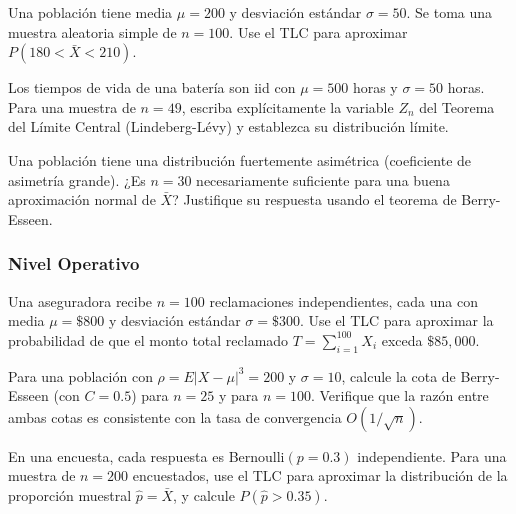 \begin{problema}
	\label{prob:5.2.1}
	Una población tiene media $\mu=200$ y desviación estándar $\sigma=50$. Se toma una muestra aleatoria simple de $n=100$. Use el TLC para aproximar $P(180 < \bar{X} < 210)$.
\end{problema}

\begin{problema}
	\label{prob:5.2.2}
	Los tiempos de vida de una batería son iid con $\mu=500$ horas y $\sigma=50$ horas. Para una muestra de $n=49$, escriba explícitamente la variable $Z_n$ del Teorema del Límite Central (Lindeberg-Lévy) y establezca su distribución límite.
\end{problema}

\begin{problema}
	\label{prob:5.2.3}
	Una población tiene una distribución fuertemente asimétrica (coeficiente de asimetría grande). ¿Es $n=30$ necesariamente suficiente para una buena aproximación normal de $\bar{X}$? Justifique su respuesta usando el teorema de Berry-Esseen.
\end{problema}

\subsubsection*{Nivel Operativo}

\begin{problema}
	\label{prob:5.2.4}
	Una aseguradora recibe $n=100$ reclamaciones independientes, cada una con media $\mu=\$800$ y desviación estándar $\sigma=\$300$. Use el TLC para aproximar la probabilidad de que el monto total reclamado $T=\sum_{i=1}^{100} X_i$ exceda $\$85{,}000$.
\end{problema}

\begin{problema}
	\label{prob:5.2.5}
	Para una población con $\rho = E|X-\mu|^3 = 200$ y $\sigma=10$, calcule la cota de Berry-Esseen (con $C=0.5$) para $n=25$ y para $n=100$. Verifique que la razón entre ambas cotas es consistente con la tasa de convergencia $O(1/\sqrt{n})$.
\end{problema}

\begin{problema}
	\label{prob:5.2.6}
	En una encuesta, cada respuesta es Bernoulli$(p=0.3)$ independiente. Para una muestra de $n=200$ encuestados, use el TLC para aproximar la distribución de la proporción muestral $\hat{p}=\bar{X}$, y calcule $P(\hat{p} > 0.35)$.
\end{problema}

